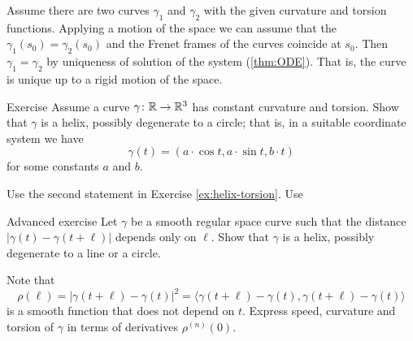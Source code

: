 Assume there are two curves $\gamma_1$ and $\gamma_2$ with the given curvature and torsion functions.
Applying a motion of the space we can assume that the $\gamma_1(s_0)=\gamma_2(s_0)$ and the Frenet frames of the curves coincide at $s_0$.
Then $\gamma_1=\gamma_2$ by uniqueness of solution of the system (\ref{thm:ODE}).
That is, the curve is unique up to a rigid motion of the space.
\qeds

\begin{thm}{Exercise}
Assume a curve $\gamma\colon\mathbb{R}\to\mathbb{R}^3$ has constant curvature and torsion.
Show that $\gamma$ is a helix, possibly degenerate to a circle;
that is, in a suitable coordinate system we have
\[\gamma(t)=(a\cdot \cos t,a\cdot\sin t, b\cdot t)\]
for some constants $a$ and $b$.
\end{thm}

 Use the second statement in Exercise \ref{ex:helix-torsion}.
Use 


\begin{thm}{Advanced exercise}
Let $\gamma$ be a smooth regular space curve such that the distance $|\gamma(t)-\gamma(t+\ell)|$ depends only on $\ell$.
Show that $\gamma$ is a helix, possibly degenerate to a line or a circle.
\end{thm}

 Note that 
\[\rho(\ell)=|\gamma(t+\ell)-\gamma(t)|^2=\langle \gamma(t+\ell)-\gamma(t),\gamma(t+\ell)-\gamma(t)\rangle\] 
is a smooth function that does not depend on $t$.
Express speed, curvature and torsion of $\gamma$ in terms of derivatives $\rho^{(n)}(0)$.
